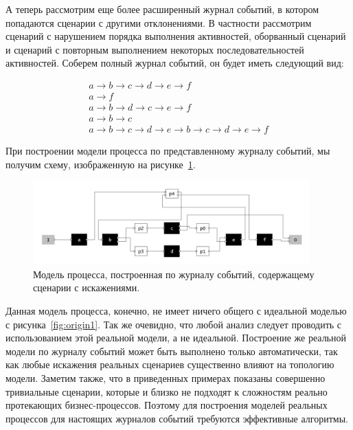 \documentclass[
11pt,%
tightenlines,%
twoside,%
onecolumn,%
nofloats,%
nobibnotes,%
nofootinbib,%
superscriptaddress,%
noshowpacs,%
centertags]%
{revtex4}
\begin{document}
А теперь рассмотрим еще более расширенный журнал событий, в котором попадаются сценарии с другими отклонениями.
В частности рассмотрим сценарий с нарушением порядка выполнения активностей, оборванный сценарий и сценарий с повторным выполнением некоторых последовательностей активностей.
Соберем полный журнал событий, он будет иметь следующий вид:

\begin{eqnarray*}
a \rightarrow b \rightarrow c \rightarrow d \rightarrow e \rightarrow f \\
a \rightarrow f \\
a \rightarrow b \rightarrow d \rightarrow c \rightarrow e \rightarrow f \\
a \rightarrow b \rightarrow c \\
a \rightarrow b \rightarrow c \rightarrow d \rightarrow e \rightarrow b \rightarrow c \rightarrow d \rightarrow e \rightarrow f
\end{eqnarray*}

При построении модели процесса по представленному журналу событий, мы получим схему, изображенную на рисунке~\ref{fig:third1}.

\begin{figure}[h]
\setcaptionmargin{5mm}
\includegraphics[width=0.95\textwidth]{pics/third1.png}
\caption{Модель процесса, построенная по журналу событий, содержащему сценарии с искажениями.}
\label{fig:third1}
\end{figure}

Данная модель процесса, конечно, не имеет ничего общего с идеальной моделью с рисунка~\ref{fig:origin1}.
Так же очевидно, что любой анализ следует проводить с использованием этой реальной модели, а не идеальной.
Построение же реальной модели по журналу событий может быть выполнено только автоматически, так как любые искажения реальных сценариев существенно влияют на топологию модели.
Заметим также, что в приведенных примерах показаны совершенно тривиальные сценарии, которые и близко не подходят к сложностям реально протекающих бизнес-процессов.
Поэтому для построения моделей реальных процессов для настоящих журналов событий требуются эффективные алгоритмы.
\end{document}
